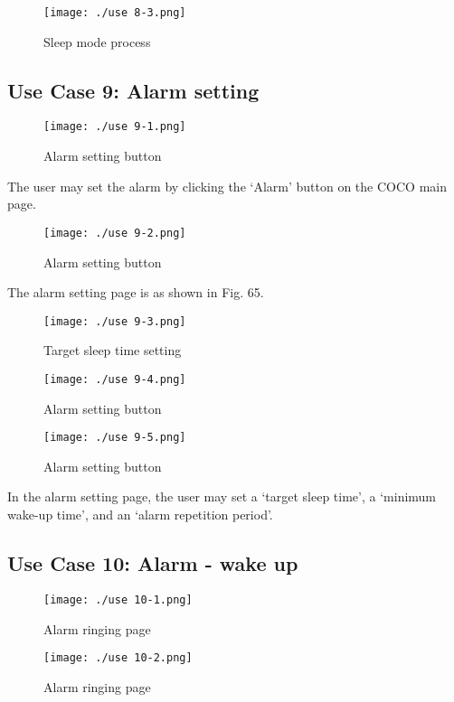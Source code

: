 \documentclass[conference]{IEEEtran}
\begin{document}
\begin{figure}[H]
\texttt{[image: ./use 8-3.png]}
\centering
\caption{Sleep mode process}
\end{figure}

\subsection{Use Case 9: Alarm setting}

\begin{figure}[H]
\texttt{[image: ./use 9-1.png]}
\centering
\caption{Alarm setting button}
\end{figure}

The user may set the alarm by clicking the ‘Alarm' button on the COCO main page.

\begin{figure}[H]
\texttt{[image: ./use 9-2.png]}
\centering
\caption{Alarm setting button}
\end{figure}

The alarm setting page is as shown in Fig. 65.

\begin{figure}[H]
\texttt{[image: ./use 9-3.png]}
\centering
\caption{Target sleep time setting}
\end{figure}

\begin{figure}[H]
\texttt{[image: ./use 9-4.png]}
\centering
\caption{Alarm setting button}
\end{figure}

\begin{figure}[H]
\texttt{[image: ./use 9-5.png]}
\centering
\caption{Alarm setting button}
\end{figure}

In the alarm setting page, the user may set a ‘target sleep time', a ‘minimum wake-up time', and an ‘alarm repetition period'.

\subsection{Use Case 10: Alarm - wake up}

\begin{figure}[H]
\texttt{[image: ./use 10-1.png]}
\centering
\caption{Alarm ringing page}
\end{figure}

\begin{figure}[H]
\texttt{[image: ./use 10-2.png]}
\centering
\caption{Alarm ringing page}
\end{figure}
\end{document}
